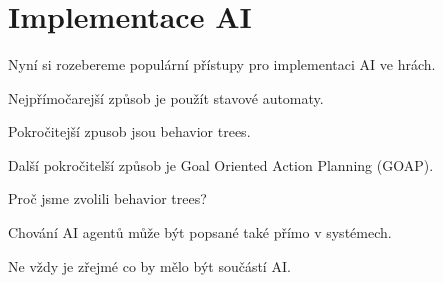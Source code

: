 \\\\
\\\\
\\\\
\\\\

\\\\









\iffalse

\section{Implementace AI}

Nyní si rozebereme populární přístupy pro implementaci AI ve hrách.

Nejpřímočarejší způsob je použít stavové automaty.

Pokročitejší zpusob jsou behavior trees.

Další pokročitelší způsob je Goal Oriented Action Planning (GOAP).

Proč jsme zvolili behavior trees?

Chování AI agentů může být popsané také přímo v systémech.

Ne vždy je zřejmé co by mělo být součástí AI.


